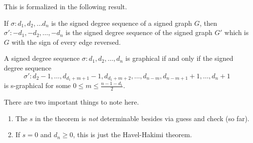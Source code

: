 \begin{frame}
    This is formalized in the following result.

    \begin{lemma}
        If $\sigma : d_1,d_2,\dots d_n$ is the signed degree sequence of a signed graph $G$, then $\sigma' : -d_1,-d_2,\dots,-d_n$ is the signed degree sequence of the signed graph $G'$ which is $G$ with the sign of every edge reversed.
    \end{lemma}
\end{frame}

\begin{frame}
    \begin{theorem}
        A signed degree sequence $\sigma : d_1,d_2,\dots,d_n$ is graphical if and only if the signed degree sequence
        \begin{equation*}
            \sigma' : d_2-1,\dots,d_{d_1+m+1}-1,d_{d_1+m+2},\dots,d_{n-m},d_{n-m+1}+1,\dots,d_n+1
        \end{equation*}
        is s-graphical for some $0 \leq m \leq \frac{n-1-d_1}{2}$.
    \end{theorem}
    There are two important things to note here.
    \begin{enumerate}
        \item The $s$ in the theorem is \textit{not} determinable besides via guess and check (so far).
        \item If $s = 0$ and $d_n \geq 0$, this is just the Havel-Hakimi theorem.
    \end{enumerate}
\end{frame}

